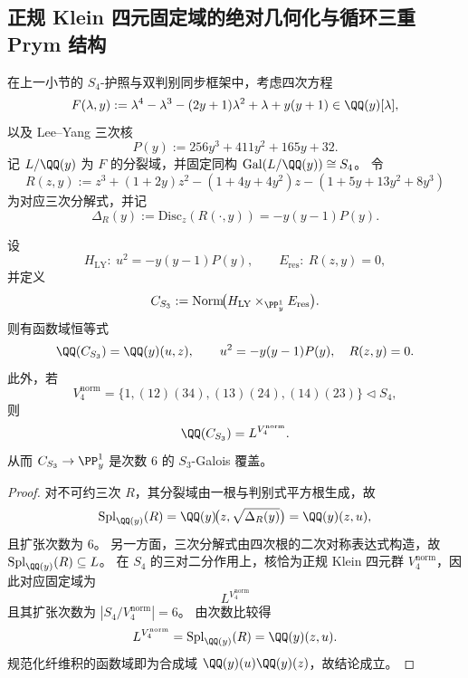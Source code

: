 \subsection{正规 Klein 四元固定域的绝对几何化与循环三重 Prym 结构}\label{subsec:cdim-s4-v4-fixedfield-resolvent-prym}
在上一小节的 \(S_4\)-护照与双判别同步框架中，考虑四次方程
\[
F(\lambda,y)
:=
\lambda^{4}-\lambda^{3}-(2y+1)\lambda^{2}+\lambda+y(y+1)\in \QQ(y)[\lambda],
\]
以及 Lee--Yang 三次核
\[
P(y):=256y^{3}+411y^{2}+165y+32.
\]
记 \(L/\QQ(y)\) 为 \(F\) 的分裂域，并固定同构
\(
\mathrm{Gal}(L/\QQ(y))\cong S_4
\)。
令
\[
R(z,y)
:=
z^{3}+(1+2y)z^{2}-(1+4y+4y^{2})z-(1+5y+13y^{2}+8y^{3})
\]
为对应三次分解式，并记
\[
\Delta_R(y):=\mathrm{Disc}_{z}(R(\cdot,y))=-y(y-1)P(y).
\]

\begin{conclusion}\label{con:cdim-s4-v4-fixedfield-fiber-product}
设
\[
H_{\mathrm{LY}}:\ u^{2}=-y(y-1)P(y),\qquad
E_{\mathrm{res}}:\ R(z,y)=0,
\]
并定义
\[
C_{S_3}:=\operatorname{Norm}\!\bigl(H_{\mathrm{LY}}\times_{\PP^1_y}E_{\mathrm{res}}\bigr).
\]
则有函数域恒等式
\[
\QQ(C_{S_3})=\QQ(y)(u,z),\qquad
u^{2}=-y(y-1)P(y),\quad R(z,y)=0.
\]
此外，若
\[
V_{4}^{\mathrm{norm}}
=
\{1,(12)(34),(13)(24),(14)(23)\}\triangleleft S_4,
\]
则
\[
\QQ(C_{S_3})=L^{V_{4}^{\mathrm{norm}}}.
\]
从而 \(C_{S_3}\to\PP^1_y\) 是次数 \(6\) 的 \(S_3\)-Galois 覆盖。
\end{conclusion}
\begin{proof}
对不可约三次 \(R\)，其分裂域由一根与判别式平方根生成，故
\[
\mathrm{Spl}_{\QQ(y)}(R)=\QQ(y)\!\bigl(z,\sqrt{\Delta_R(y)}\bigr)=\QQ(y)(z,u),
\]
且扩张次数为 \(6\)。
另一方面，三次分解式由四次根的二次对称表达式构造，故 \(\mathrm{Spl}_{\QQ(y)}(R)\subseteq L\)。
在 \(S_4\) 的三对二分作用上，核恰为正规 Klein 四元群 \(V_{4}^{\mathrm{norm}}\)，因此对应固定域为
\[
L^{V_{4}^{\mathrm{norm}}}
\]
且其扩张次数为 \(|S_4/V_4^{\mathrm{norm}}|=6\)。
由次数比较得
\[
L^{V_{4}^{\mathrm{norm}}}=\mathrm{Spl}_{\QQ(y)}(R)=\QQ(y)(z,u).
\]
规范化纤维积的函数域即为合成域 \(\QQ(y)(u)\QQ(y)(z)\)，故结论成立。
\end{proof}

